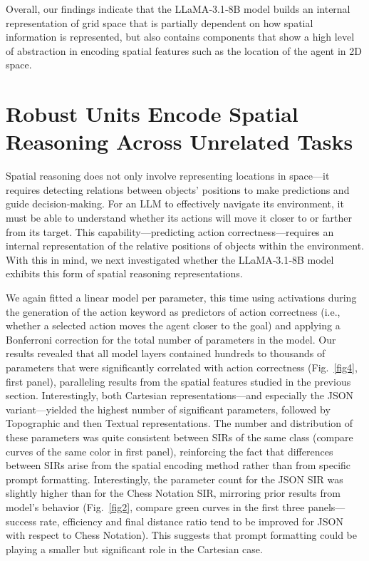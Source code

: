 \documentclass[runningheads]{llncs}
\begin{document}
Overall, our findings indicate that the LLaMA‑3.1‑8B model builds an internal representation of grid space that is partially dependent on how spatial information is represented, but also contains components that show a high level of abstraction in encoding spatial features such as the location of the agent in 2D space.


\section{Robust Units Encode Spatial Reasoning Across Unrelated Tasks}

Spatial reasoning does not only involve representing locations in space—it requires detecting relations between objects’ positions to make predictions and guide decision-making. For an LLM to effectively navigate its environment, it must be able to understand whether its actions will move it closer to or farther from its target. This capability—predicting action correctness—requires an internal representation of the relative positions of objects within the environment. With this in mind, we next investigated whether the LLaMA‑3.1‑8B model exhibits this form of spatial reasoning representations.

We again fitted a linear model per parameter, this time using activations during the generation of the action keyword as predictors of action correctness (i.e., whether a selected action moves the agent closer to the goal) and applying a Bonferroni correction for the total number of parameters in the model. Our results revealed that all model layers contained hundreds to thousands of parameters that were significantly correlated with action correctness (Fig.~\ref{fig4}, first panel), paralleling results from the spatial features studied in the previous section. Interestingly, both Cartesian representations—and especially the JSON variant—yielded the highest number of significant parameters, followed by Topographic and then Textual representations. The number and distribution of these parameters was quite consistent between SIRs of the same class (compare curves of the same color in first panel), reinforcing the fact that differences between SIRs arise from the spatial encoding method rather than from specific prompt formatting. Interestingly, the parameter count for the JSON SIR was slightly higher than for the Chess Notation SIR, mirroring prior results from model’s behavior (Fig.~\ref{fig2}, compare green curves in the first three panels—success rate, efficiency and final distance ratio tend to be improved for JSON with respect to Chess Notation). This suggests that prompt formatting could be playing a smaller but significant role in the Cartesian case.
\end{document}
